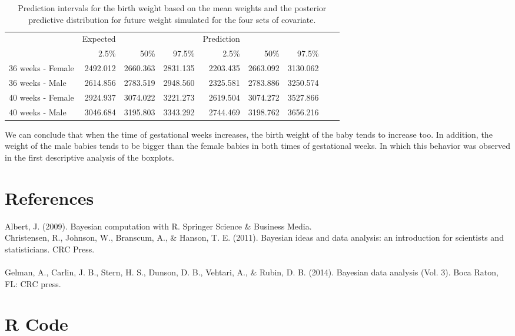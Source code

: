 \documentclass[a4paper, 11pt]{article}
\begin{document}
\begin{table}[H]
\caption{Prediction intervals for the birth weight based on the mean weights and the posterior predictive distribution for future weight simulated for the four sets of covariate.}\label{pred}
\centering
\begin{tabular}{lrrrrrrrr}
\hline
 & Expected & & & Prediction & & &\\
\cline{2-4} \cline{5-7}
& 2.5\% & 50\% & 97.5\% & 2.5\% & 50\% & 97.5\%  \\
\hline
$36$ weeks - Female & 2492.012 & 2660.363 & 2831.135 & 2203.435 & 2663.092 & 3130.062 \\

$36$ weeks - Male & 2614.856 & 2783.519 & 2948.560 & 2325.581 & 2783.886 & 3250.574\\

$40$ weeks - Female & 2924.937 & 3074.022 & 3221.273 & 2619.504 & 3074.272 & 3527.866 \\

$40$ weeks - Male & 3046.684 & 3195.803 & 3343.292 & 2744.469 & 3198.762 & 3656.216 \\
\hline
\end{tabular}
\end{table}

We can conclude that when the time of gestational weeks increases, the birth weight of the baby tends to increase too. In addition, the weight of the male babies tends to be bigger than the female babies in both times of gestational weeks. In which this behavior was observed in the first descriptive analysis of the boxplots.

\noindent
\section*{References} 
\noindent
Albert, J. (2009). Bayesian computation with R. Springer Science \& Business Media.\\

\noindent
Christensen, R., Johnson, W., Branscum, A., \& Hanson, T. E. (2011). Bayesian ideas and data analysis: an introduction for scientists and statisticians. CRC Press. \\\\
\noindent
Gelman, A., Carlin, J. B., Stern, H. S., Dunson, D. B., Vehtari, A., \& Rubin, D. B. (2014). Bayesian data analysis (Vol. 3). Boca Raton, FL: CRC press. \\


\newpage
\section{R Code}\label{code}
\end{document}
